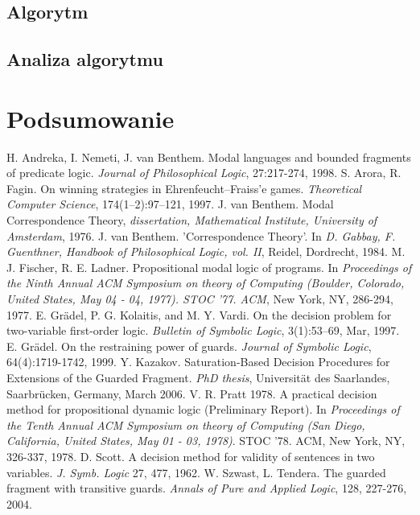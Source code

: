 \documentclass[a4paper]{article}
\begin{document}
\subsection{Algorytm}
\subsection{Analiza algorytmu}
\section{Podsumowanie}
\begin{thebibliography}{12}
	H. Andreka, I. Nemeti, J. van Benthem. Modal languages and bounded fragments of predicate logic. \emph{Journal of Philosophical Logic}, 27:217-274, 1998. 
	S. Arora, R. Fagin. On winning strategies in Ehrenfeucht--Fraiss'e games. \emph{Theoretical Computer Science}, 174(1--2):97--121, 1997. 
	J. van Benthem. Modal Correspondence Theory, \emph{dissertation, Mathematical Institute, University of Amsterdam}, 1976.
	J. van Benthem. 'Correspondence Theory'. In \emph{D. Gabbay, F. Guenthner, Handbook of Philosophical Logic, vol. II}, Reidel, Dordrecht, 1984.
	M. J. Fischer, R. E. Ladner. Propositional modal logic of programs. In \emph{Proceedings of the Ninth Annual ACM Symposium on theory of Computing (Boulder, Colorado, United States, May 04 - 04, 1977). STOC '77. ACM}, New York, NY, 286-294, 1977.
	E. Gr\"{a}del, P. G. Kolaitis, and M. Y. Vardi. On the decision problem for two-variable first-order logic. \emph{Bulletin of Symbolic Logic}, 3(1):53--69, Mar, 1997.
	E. Gr\"{a}del. On the restraining power of guards. \emph{Journal of Symbolic Logic}, 64(4):1719-1742, 1999.
	Y. Kazakov. Saturation-Based Decision Procedures for Extensions of the Guarded Fragment.
	{\it PhD thesis}, Universit\"{a}t des Saarlandes, Saarbr\"{u}cken, Germany, March 2006.
	V. R. Pratt 1978. A practical decision method for propositional dynamic logic (Preliminary Report). In \emph{Proceedings of the Tenth Annual ACM Symposium on theory of Computing (San Diego, California, United States, May 01 - 03, 1978)}. STOC '78. ACM, New York, NY, 326-337, 1978.
	D. Scott. A decision method for validity of sentences in two variables. \emph{J. Symb. Logic} 27, 477, 1962.
	W. Szwast, L. Tendera. The guarded fragment with transitive guards. \emph{Annals of Pure and Applied Logic}, 128, 227-276, 2004.
\end{thebibliography}


 
\end{document}
